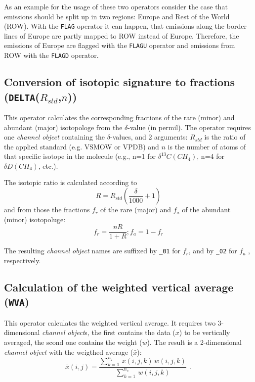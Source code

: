 \documentclass[twoside]{article}
\begin{document}
As an example for the usage of these two operators consider the case that
emissions should be split up in two regions: Europe and Rest of the World
(ROW).  With the {\tt FLAG} operator it can happen, that emissions along the
border lines of Europe are partly mapped to ROW instead of Europe. Therefore, the emissions of Europe are flagged with the {\tt FLAGU} operator and emissions from ROW with the {\tt FLAGD} operator.

\subsection{Conversion of isotopic signature to fractions ({\tt DELTA}($R_{std}$,$n$))}
\label{sec:delta}
This operator calculates the corresponding
fractions of the rare (minor) and abundant (major) isotopologe from the
$\delta$-value (in permil). The operator requires
one {\it channel object} containing the $\delta$-values, and
2 arguments:
$R_{std}$ is the ratio of the applied
standard (e.g. VSMOW or VPDB) and $n$ is the number of atoms of that
specific isotope in the molecule (e.g., n=1 for ${\delta}^{13}C(CH_4)$, n=4
for ${\delta}D(CH_4)$, etc.).

The isotopic ratio is calculated according to
%
\begin{equation}
   R = R_{std}  (\frac{\delta}{1000} + 1)
\end{equation}
and from those the fractions $f_r$ of the rare (major) and $f_{a}$ of the
abundant (minor) isotopoluge:
\begin{equation}
   f_{r} = \frac{n R}{1+R}; f_{a} = 1 - f_{r}
\end{equation}

The resulting {\it channel object} names are suffixed by {\tt \_01} for $f_r$,
and by {\tt \_02} for $f_a$ , respectively.

\subsection{Calculation of the weighted vertical average ({\tt WVA})}
\label{sec:wva}
This operator calculates the weighted vertical average. It requires two
3-dimensional {\it channel object}s, the first contains the data ($x$) to be
vertically averaged, the scond one contains the weight ($w$). The result is
a 2-dimensional {\it channel object} with the weigthed average ($\bar{x}$):
\begin{equation}
  \bar{x}(i,j) = \frac{\sum_{k=1}^{n_z}\,x(i,j,k)\,w(i,j,k)}
                      {\sum_{k=1}^{n_z}\,w(i,j,k)}~~.
\end{equation}
\end{document}
